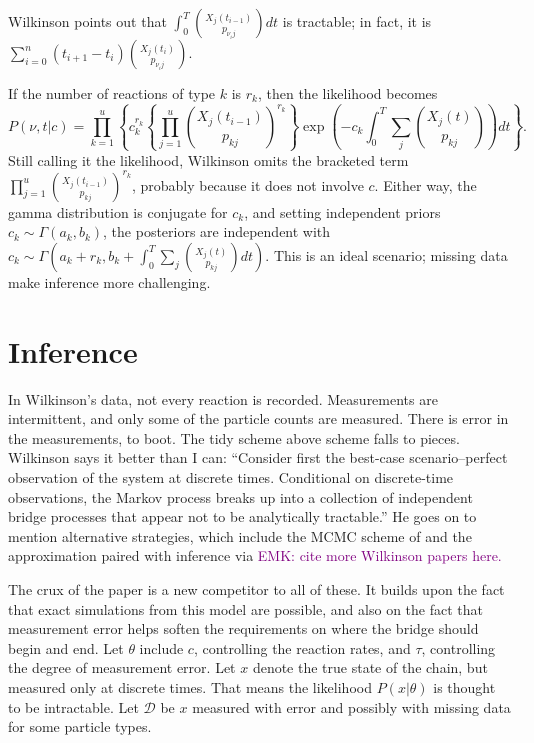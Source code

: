 \documentclass{article}
\newcommand\EMK[1]{\textcolor{purple}{EMK: #1}}
\begin{document}
Wilkinson points out that $\int_0^T {{X_j(t_{i-1})}\choose{p_{{\nu_i}j}}}dt$ is tractable; in fact, it is $\sum_{i=0}^{n} (t_{i+1}-t_{i}) {{X_j(t_{i})}\choose{p_{{\nu_i}j}}}$. 

If the number of reactions of type $k$ is $r_k$, then the likelihood becomes 
$$P(\nu, t|c) = \prod_{k=1}^u \left\{ c_{k}^{r_k} 
\left\{\prod_{j=1}^u { X_{j}(t_{i-1})\choose p_{kj}}^{r_k}\right\}\exp(-c_{k}\int_0^T \sum_j{X_j(t)\choose p_{kj}} )dt\right\}.$$  
Still calling it the likelihood, Wilkinson omits the bracketed term $\prod_{j=1}^u { X_{j}(t_{i-1})\choose p_{kj}}^{r_k}$, probably because it does not involve $c$. Either way, the gamma distribution is conjugate for $c_k$, and setting independent priors $c_k\sim \Gamma(a_k, b_k)$, the posteriors are independent with $c_k\sim \Gamma(a_k+r_k, b_k+\int_0^T \sum_j {X_j(t) \choose p_{kj}}dt )$. This is an ideal scenario; missing data make inference more challenging.

\section{Inference}

In Wilkinson's data, not every reaction is recorded. Measurements are intermittent, and only some of the particle counts are measured. There is error in the measurements, to boot.  The tidy scheme above scheme falls to pieces. Wilkinson says it better than I can: ``Consider first the best-case scenario--perfect observation of the system at discrete times. Conditional on discrete-time observations, the Markov process breaks up into a collection of independent bridge processes that appear not to be analytically tractable.'' He goes on to mention alternative strategies, which include the MCMC scheme of \cite{Boys2008} and the approximation \cite{gillespie_CLE_2000} paired with inference via \EMK{cite more Wilkinson papers here.}


The crux of the paper is a new competitor to all of these. It builds upon the fact that exact simulations from this model are possible, and also on the fact that measurement error helps soften the requirements on where the bridge should begin and end. Let $\theta$ include $c$, controlling the reaction rates, and $\tau$, controlling the degree of measurement error. Let $x$ denote the true state of the chain, but measured only at discrete times. That means the likelihood $P(x|\theta)$ is thought to be intractable. Let $\mathcal{D}$ be $x$ measured with error and possibly with missing data for some particle types. 
\end{document}
